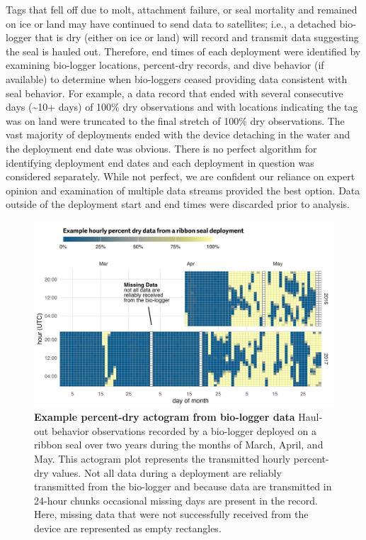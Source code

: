 \documentclass[fleqn,10pt,lineno]{wlpeerj} %
\begin{document}
Tags that fell off due to molt, attachment failure, or seal mortality and remained
on ice or land may have continued to send data to satellites; i.e., a detached
bio-logger that is dry (either on ice or land) will record and transmit data
suggesting the seal is hauled out. Therefore, end times of each deployment were
identified by examining bio-logger locations, percent-dry records, and dive
behavior (if available) to determine when bio-loggers ceased providing data
consistent with seal behavior. For example, a data record that ended with several
consecutive days (\textasciitilde10+ days) of 100\% dry observations and with locations
indicating the tag was on land were truncated to the final
stretch of 100\% dry observations. The vast majority of deployments ended with the
device detaching in the water and the deployment end date was obvious. There is
no perfect algorithm for identifying deployment end dates and each deployment in
question was considered separately. While not perfect, we are confident our
reliance on expert opinion and examination of multiple data streams provided the
best option. Data outside of the deployment start and end times were discarded
prior to analysis.










\begin{figure}
\includegraphics[width=1\linewidth]{../figures/Figure-002} \caption{\textbf{Example percent-dry actogram from bio-logger data}
\linebreak Haul-out behavior observations recorded by a bio-logger deployed on a
ribbon seal over two years during the months of March, April, and May. This
actogram plot represents the transmitted hourly percent-dry values. Not all data
during a deployment are reliably transmitted from the bio-logger and because data
are transmitted in 24-hour chunks occasional missing days are present in the
record. Here, missing data that were not successfully received from the device
are represented as empty rectangles.}\label{fig:examplePlot}
\end{figure}
\end{document}
